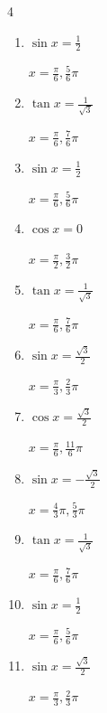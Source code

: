 \begin{multicols}{4}
\begin{enumerate}
  \item $\displaystyle \sin{x}  = \frac{1}{2}$

        $\displaystyle x = \frac{\pi}{6} , \frac{5}{6}\pi$

\columnbreak %

  \item $\displaystyle \tan{x}  = \frac{1}{\sqrt{3}}$

        $\displaystyle x = \frac{\pi}{6} , \frac{7}{6}\pi$

  \item $\displaystyle \sin{x}  = \frac{1}{2}$

        $\displaystyle x = \frac{\pi}{6} , \frac{5}{6}\pi$

  \item $\displaystyle \cos{x}  = 0$

        $\displaystyle x = \frac{\pi}{2} , \frac{3}{2}\pi$

  \item $\displaystyle \tan{x}  = \frac{1}{\sqrt{3}}$

        $\displaystyle x = \frac{\pi}{6} , \frac{7}{6}\pi$

  \item $\displaystyle \sin{x}  = \frac{\sqrt{3}}{2}$

        $\displaystyle x = \frac{\pi}{3} , \frac{2}{3}\pi$

  \item $\displaystyle \cos{x}  = \frac{\sqrt{3}}{2}$

        $\displaystyle x = \frac{\pi}{6} , \frac{11}{6}\pi$

  \item $\displaystyle \sin{x}  = -\frac{\sqrt{3}}{2}$

        $\displaystyle x = \frac{4}{3}\pi , \frac{5}{3}\pi$

  \item $\displaystyle \tan{x}  = \frac{1}{\sqrt{3}}$

        $\displaystyle x = \frac{\pi}{6} , \frac{7}{6}\pi$

  \item $\displaystyle \sin{x}  = \frac{1}{2}$

        $\displaystyle x = \frac{\pi}{6} , \frac{5}{6}\pi$

  \item $\displaystyle \sin{x}  = \frac{\sqrt{3}}{2}$

        $\displaystyle x = \frac{\pi}{3} , \frac{2}{3}\pi$


\end{enumerate}
\end{multicols}
